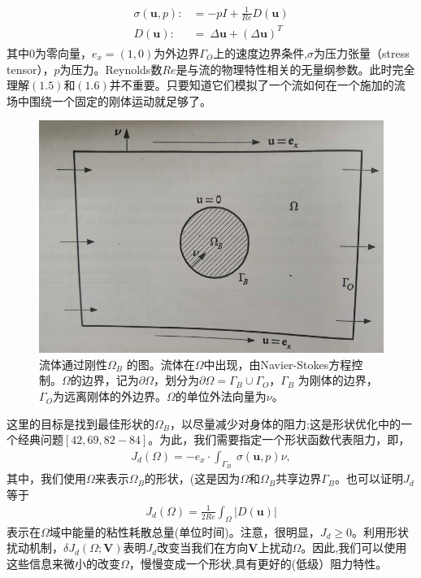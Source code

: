 \documentclass[12pt,a4paper]{article}
\numberwithin{equation}{section}
\begin{document}
\begin{gather}
\begin{aligned}
\sigma(\mathbf{u},p):& = -pI+\frac{1}{Re}D(\mathbf{u})\\D(\mathbf{u}):& = ~\Delta \mathbf{u}+(\Delta \mathbf{u})^T
\end{aligned}
\end{gather}
其中$0$为零向量，$e_x =(1,0)$为外边界$\Gamma _O$上的速度边界条件,$\sigma$为压力张量（stress tensor），$p$为压力。Reynolds数$Re$是与流的物理特性相关的无量纲参数。此时完全理解$(1.5)$和$(1.6)$并不重要。只要知道它们模拟了一个流如何在一个施加的流场中围绕一个固定的刚体运动就足够了。
\begin{figure}[H]
\centering
\includegraphics[scale=0.5]{./figures/11.png}
\caption{流体通过刚性$\Omega _B$ 的图。流体在$\Omega$中出现，由Navier-Stokes方程控制。$\Omega$的边界，记为$\partial \Omega$，划分为$\partial \Omega = \Gamma _B \cup \Gamma _O$，$\Gamma _B$ 为刚体的边界，$\Gamma _O$为远离刚体的外边界。$\Omega$的单位外法向量为$\nu$。}
\end{figure}

这里的目标是找到最佳形状的$\Omega _B$，以尽量减少对身体的阻力;这是形状优化中的一个经典问题$[42,69,82 -84]$。为此，我们需要指定一个形状函数代表阻力，即，
\begin{gather}
J_d(\Omega)=-e_x \cdot \int_{\Gamma _B}~\sigma(\mathbf{u},p)\nu,
\end{gather}
其中，我们使用$\Omega$来表示$\Omega _B$的形状，(这是因为$\Omega$和$\Omega _B$共享边界$\Gamma _B$。也可以证明$J_d$等于
\begin{gather}
J_d(\Omega)=\frac{1}{2Re}\int _{\Omega}\left| D(\mathbf{u}) \right|
\end{gather}
表示在$\Omega$域中能量的粘性耗散总量(单位时间)。注意，很明显，$J_d \geq 0$。利用形状扰动机制，$\delta J_d(\Omega;\mathbf{V})$表明$J_d$改变当我们在方向$\mathbf{V}$上扰动$\Omega$。因此,我们可以使用这些信息来微小的改变$\Omega$，慢慢变成一个形状,具有更好的(低级）阻力特性。
\end{document}
